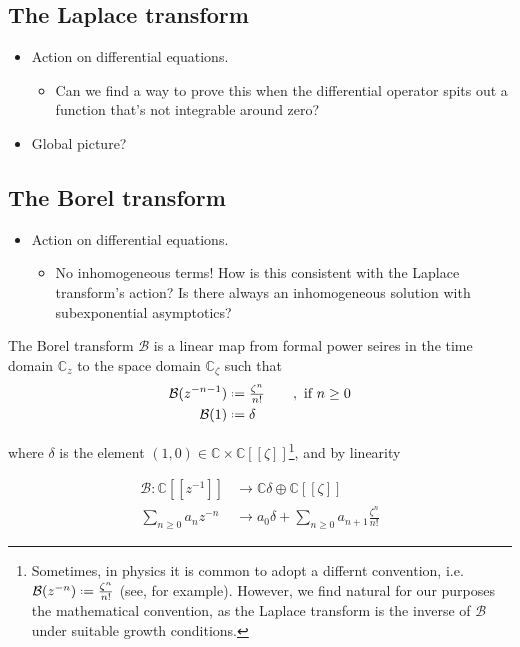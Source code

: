\documentclass{article}
\newcommand{\C}{\mathbb{C}}
\newcommand*{\defeq}{\mathrel{\vcenter{\baselineskip0.5ex \lineskiplimit0pt
                     \hbox{\scriptsize.}\hbox{\scriptsize.}}}%
                     =}
\begin{document}
\color{gray}
\subsection{The Laplace transform}
\begin{itemize}
\item Action on differential equations.
\begin{itemize}
\item Can we find a way to prove this when the differential operator spits out a function that's not integrable around zero?
\end{itemize}
\item Global picture?
\end{itemize}
\color{black}


\subsection{The Borel transform}
\color{gray}
\begin{itemize}
\item Action on differential equations.
\begin{itemize}
\item No inhomogeneous terms! How is this consistent with the Laplace transform's action? Is there always an inhomogeneous solution with subexponential asymptotics?
\end{itemize}
\end{itemize}
\color{black}

The Borel transform $\mathcal{B}$ is a linear map from formal power seires in the time domain $\C_z$ to the space domain $\C_{\zeta}$ such that  \begin{align*}\mathcal{B}(z^{-n-1})&\defeq\tfrac{\zeta^n}{n!} \qquad, \text{ if } n\geq 0 \\
\mathcal{B}(1)&\defeq\delta 
\end{align*} 

where $\delta$ is the element $(1,0)\in\C\times\C[\![\zeta]\!]$\footnote{Sometimes, in physics it is common to adopt a differnt convention, i.e. $\mathcal{B}(z^{-n})\defeq \tfrac{\zeta^n}{n!}$ (see\cite{MDiablerets}\cite{SGM}, for example). However, we find natural for our purposes the mathematical convention, as the Laplace transform is the inverse of $\mathcal{B}$ under suitable growth conditions. }, and by linearity   

\begin{align*}
\mathcal{B}\colon \C[\![z^{-1}]\!] & \to \C\delta\oplus\C[\![\zeta]\!] \\
\sum_{n\geq 0}a_n z^{-n} & \to  a_0\delta+\sum_{n\geq 0}a_{n+1}\frac{\zeta^n}{n!}
\end{align*}
\end{document}
